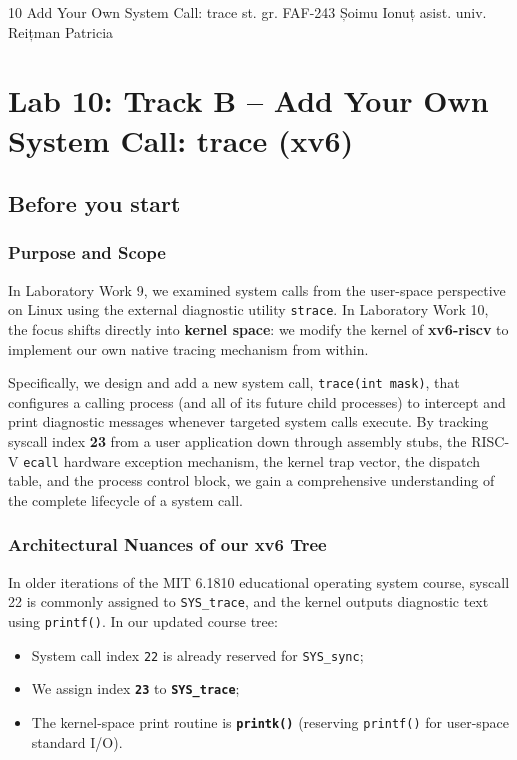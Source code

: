 \documentclass{labreport}
\begin{document}
\labtitle
    {10}
    {Add Your Own System Call: trace}
    {st. gr. FAF-243}
    {Șoimu Ionuț}
    {asist. univ.\\[0.15cm] Reițman Patricia}

\tableofcontents
\newpage

\section{Lab 10: Track B -- Add Your Own System Call: trace (xv6)}

\subsection{Before you start}

\subsubsection*{Purpose and Scope}
In Laboratory Work 9, we examined system calls from the user-space perspective on Linux using the external diagnostic utility \texttt{strace}. In Laboratory Work 10, the focus shifts directly into \textbf{kernel space}: we modify the kernel of \textbf{xv6-riscv} to implement our own native tracing mechanism from within.

Specifically, we design and add a new system call, \texttt{trace(int mask)}, that configures a calling process (and all of its future child processes) to intercept and print diagnostic messages whenever targeted system calls execute. By tracking syscall index \textbf{23} from a user application down through assembly stubs, the RISC-V \texttt{ecall} hardware exception mechanism, the kernel trap vector, the dispatch table, and the process control block, we gain a comprehensive understanding of the complete lifecycle of a system call.

\subsubsection*{Architectural Nuances of our xv6 Tree}
In older iterations of the MIT 6.1810 educational operating system course, syscall 22 is commonly assigned to \texttt{SYS\_trace}, and the kernel outputs diagnostic text using \texttt{printf()}. In our updated course tree:
\begin{itemize}[noitemsep]
    \item System call index \texttt{22} is already reserved for \texttt{SYS\_sync};
    \item We assign index \textbf{\texttt{23}} to \textbf{\texttt{SYS\_trace}};
    \item The kernel-space print routine is \textbf{\texttt{printk()}} (reserving \texttt{printf()} for user-space standard I/O).
\end{itemize}
\end{document}
